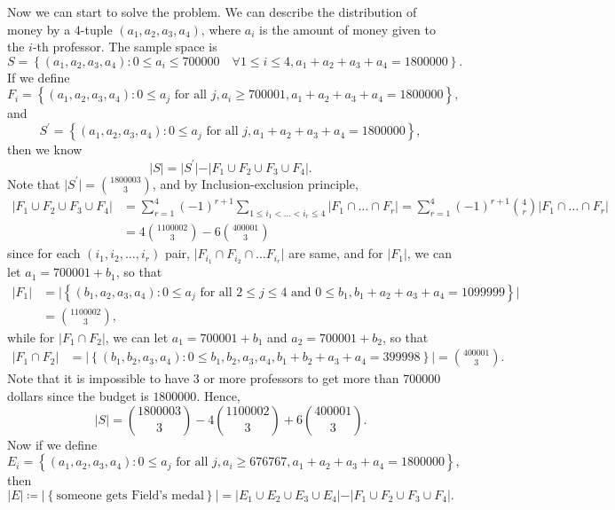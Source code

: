 \documentclass[a4paper,12pt]{article}
\begin{document}
Now we can start to solve the problem. We can describe the distribution of money by a \(4\)-tuple \((a_1, a_2, a_3, a_4)\), where \(a_i\) is the amount of money given to the \(i\)-th professor. The sample space is 
\[
	S = \left\{ (a_1, a_2, a_3, a_4) : 0 \le a_i \le 700000 \quad \forall 1 \le i \le 4, a_1 + a_2 + a_3 + a_4 = 1800000   \right\}. 
\]  
If we define
\[
	F_i = \left\{ (a_1, a_2, a_3, a_4) : 0 \le a_j \text{ for all } j, a_i \ge 700001, a_1 + a_2 + a_3 + a_4 = 1800000   \right\}, 
\]
and
\[
	S^{\prime} = \left\{ (a_1, a_2, a_3, a_4) : 0 \le a_j \text{ for all } j, a_1 + a_2 + a_3 + a_4 = 1800000    \right\}, 
\]
then we know 
\[
	\vert S \vert = \vert S^{\prime} \vert - \vert F_1 \cup F_2 \cup F_3 \cup F_4 \vert.   
\]
Note that \(\vert S^{\prime}  \vert = \binom{1800003}{3} \), and by Inclusion-exclusion principle, 
\begin{align*}
	\vert F_1 \cup F_2 \cup F_3 \cup F_4 \vert &= \sum_{r=1}^4 (-1)^{r+1} \sum_{1 \le i_1 < \dots < i_r \le 4}  \vert F_1 \cap \dots \cap F_r \vert = \sum_{r=1}^4 (-1)^{r+1} \binom{4}{r} \vert F_1 \cap \dots \cap F_r \vert \\
	&= 4 \binom{1100002}{3} - 6 \binom{400001}{3} 
\end{align*}
since for each \((i_1, i_2, \dots , i_r)\) pair, \(\vert F_{i_1} \cap F_{i_2} \cap \dots F_{i_r} \vert \) are same, and for \(\vert F_1 \vert \), we can let \(a_1 = 700001 + b_1\), so that
\begin{align*}
	\vert F_1 \vert &= \vert \left\{ (b_1, a_2, a_3, a_4): 0 \le a_j \text{ for all } 2 \le j \le 4 \text{ and } 0 \le b_1, b_1 + a_2 + a_3 + a_4 = 1099999    \right\} \vert \\
	&= \binom{1100002}{3}, 
\end{align*}      
while for \(\vert F_1 \cap F_2 \vert \), we can let \(a_1 = 700001 + b_1\) and \(a_2 = 700001 + b_2\), so that    
\begin{align*}
	\vert F_1 \cap F_2 \vert &= \vert \left\{ (b_1, b_2, a_3, a_4): 0 \le b_1, b_2, a_3, a_4, b_1 + b_2 + a_3 + a_4 = 399998 \right\}  \vert = \binom{400001}{3}. 
\end{align*} 
Note that it is impossible to have \(3\) or more professors to get more than \(700000\) dollars since the budget is \(1800000\).   
Hence, 
\[
	\vert S \vert = \binom{1800003}{3} - 4 \binom{1100002}{3} + 6 \binom{400001}{3}. 
\]
Now if we define 
\[
	E_i = \left\{ (a_1, a_2, a_3, a_4): 0 \le a_j \text{ for all } j, a_i \ge 676767, a_1 + a_2 + a_3 + a_4 = 1800000 \right\}, 
\]
then 
\[
	\vert E \vert \coloneqq \vert \left\{ \text{someone gets Field's medal}  \right\} \vert  = \vert E_1 \cup E_2 \cup E_3 \cup E_4 \vert - \vert F_1 \cup F_2 \cup F_3 \cup F_4 \vert.   
\]
\end{document}
